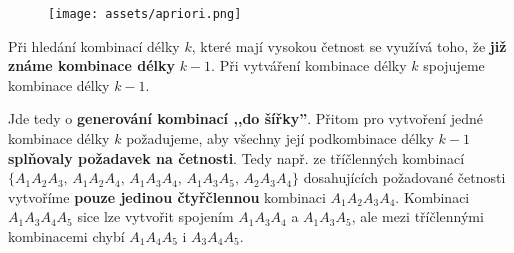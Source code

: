\begin{figure}[H]
    \centering
    \texttt{[image: assets/apriori.png]}
\end{figure}

Při hledání kombinací délky $ k $, které mají vysokou četnost se využívá toho, že \textbf{již známe kombinace délky} $ k-1 $. Při vytváření kombinace délky $ k $ spojujeme kombinace délky $ k-1 $.

Jde tedy o \textbf{generování kombinací ,,do šířky''}. Přitom pro vytvoření jedné kombinace délky $ k $ požadujeme, aby všechny její podkombinace délky $ k-1 $ \textbf{splňovaly požadavek na četnosti}. Tedy např. ze tříčlenných kombinací $\{A_1A_2A_3,  \,A_1A_2A_4, \, A_1A_3A_4, \,A_1A_3A_5,  \,A_2A_3A_4\}$ dosahujících požadované četnosti vytvoříme \textbf{pouze jedinou čtyřčlennou} kombinaci $ A_1A_2A_3A_4 $. Kombinaci $ A_1A_3A_4A_5 $ sice lze vytvořit spojením $ A_1A_3A_4 $ a
$ A_1A_3A_5 $, ale mezi tříčlennými kombinacemi chybí $ A_1A_4A_5 $ i $ A_3A_4A_5 $.

